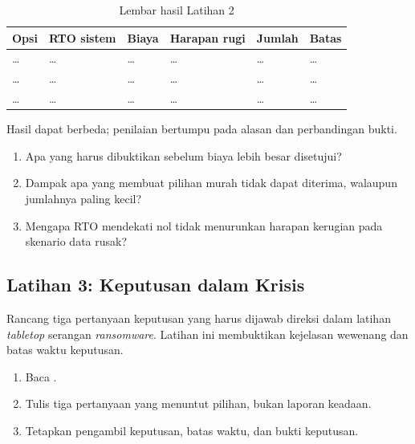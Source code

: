 \begin{table}[!htb]
  \centering\small
  \caption{Lembar hasil Latihan 2}\label{tab:ch10-lat2-hasil}
  \begin{tabularx}{\textwidth}{|>{\raggedright\arraybackslash}p{}|>{\raggedright\arraybackslash}X|>{\raggedright\arraybackslash}X|>{\raggedright\arraybackslash}X|>{\raggedright\arraybackslash}X|>{\raggedright\arraybackslash}X|}
    \hline
    \textbf{Opsi} & \textbf{RTO sistem} & \textbf{Biaya} & \textbf{Harapan rugi} & \textbf{Jumlah} &
    \textbf{Batas} \\ \hline
    \dots & \dots & \dots & \dots & \dots & \dots \\ \hline
    \dots & \dots & \dots & \dots & \dots & \dots \\ \hline
    \dots & \dots & \dots & \dots & \dots & \dots \\ \hline
  \end{tabularx}
\end{table}

Hasil dapat berbeda; penilaian bertumpu pada alasan dan perbandingan bukti.
\begin{enumerate}
  \item Apa yang harus dibuktikan sebelum biaya lebih besar disetujui?
  \item Dampak apa yang membuat pilihan murah tidak dapat diterima, walaupun jumlahnya paling kecil?
  \item Mengapa RTO mendekati nol tidak menurunkan harapan kerugian pada skenario data rusak?
\end{enumerate}

\subsection*{Latihan 3: Keputusan dalam Krisis}

Rancang tiga pertanyaan keputusan yang harus dijawab direksi dalam latihan \textit{tabletop}
serangan \textit{ransomware}. Latihan ini membuktikan kejelasan wewenang dan batas waktu keputusan.

\begin{enumerate}
  \item Baca .
  \item Tulis tiga pertanyaan yang menuntut pilihan, bukan laporan keadaan.
  \item Tetapkan pengambil keputusan, batas waktu, dan bukti keputusan.
\end{enumerate}

